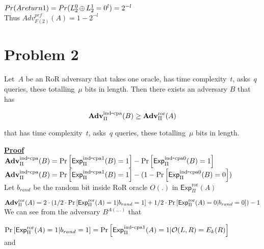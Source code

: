\documentclass[11pt]{article}
\newcommand{\ExpRoR}[2]{\mathsf{Exp}^{\mathrm{ror}}_{#1}{(#2)}}
\newcommand{\ExpINDz}[2]{\mathsf{Exp}^{\mathrm{ind}\mbox{-}\mathrm{cpa0}}_{#1}{(#2)}}
\newcommand{\ExpINDo}[2]{\mathsf{Exp}^{\mathrm{ind}\mbox{-}\mathrm{cpa1}}_{#1}{(#2)}}
\newcommand{\AdvRoR}[2]{\Adv^{\mathrm{ror}}_{#1}(#2)}
\newcommand{\AdvIND}[2]{\Adv^{\mathrm{ind}\mbox{-}\mathrm{cpa}}_{#1}(#2)}
\begin{document}
$Pr(A return 1) = Pr (L_2^0 {\,\oplus\,} L_2^1 = 0^l) = 2^{-l}$\\

Thus $Adv^{prf}_{F(2)}(A) = 1 - 2^{-l}$

\section*{Problem 2} 
 
Let~$A$ be an RoR adversary that takes one oracle, has time complexity~$t$, asks~$q$ queries, these totalling~$\mu$ bits in length.   Then there exists an adversary $B$ that has 

\[
\AdvIND{\Pi}{B} \geq \AdvRoR{\Pi}{A} 
\]

that has time complexity~$t$, asks~$q$ queries, these totalling~$\mu$ bits in length.   

\begin{figure*}[h]
\center
{}
\end{figure*}



{\bf \underline{Proof}}\\


$\AdvIND{\Pi}{B} = \Pr\left[\ExpINDo{\Pi}{B}=1 \right] - \Pr\left[\ExpINDz{\Pi}{B}=1 \right]$\\

$\AdvIND{\Pi}{B} = \Pr\left[\ExpINDo{\Pi}{B}=1 \right] - (1 - \Pr\left[\ExpINDz{\Pi}{B}=0 \right])$\\



Let $b_{rand}$ be the random bit inside RoR oracle $O(.)$ in $\ExpRoR{\Pi}{A}$

$\AdvRoR{\Pi}{A}  = 2  \cdot( 1/2 \cdot \Pr\left[\ExpRoR{\Pi}{A}=1 | b_{rand}=1 \right] + 1/2\cdot \Pr\left[\ExpRoR{\Pi}{A}=0 | b_{rand}=0 \right]) - 1$\\

We can see from the adversary $B^{A(.,.)}$ that 

$\Pr\left[\ExpRoR{\Pi}{A}=1 | b_{rand}=1 \right] = \Pr\left[\ExpINDo{\Pi}{A}=1 | \calO(L,R) = E_k(R) \right]$ \\

and
\end{document}
